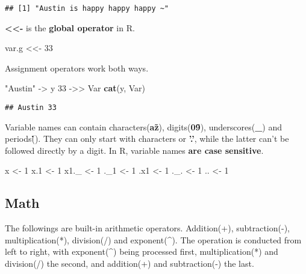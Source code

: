 \documentclass[
  12pt,
]{article}
\newenvironment{Shaded}{\begin{snugshade}}{\end{snugshade}}
\newcommand{\DecValTok}[1]{\textcolor[rgb]{0.00,0.00,0.81}{#1}}
\newcommand{\FloatTok}[1]{\textcolor[rgb]{0.00,0.00,0.81}{#1}}
\newcommand{\FunctionTok}[1]{\textcolor[rgb]{0.13,0.29,0.53}{\textbf{#1}}}
\newcommand{\NormalTok}[1]{#1}
\newcommand{\OtherTok}[1]{\textcolor[rgb]{0.56,0.35,0.01}{#1}}
\newcommand{\StringTok}[1]{\textcolor[rgb]{0.31,0.60,0.02}{#1}}
\begin{document}
\begin{verbatim}
## [1] "Austin is happy happy happy ~"
\end{verbatim}

\textbf{<<-} is the \textbf{global operator} in R.

\begin{Shaded}
\begin{Highlighting}[]
\NormalTok{var.g }\OtherTok{\textless{}\textless{}{-}} \DecValTok{33}
\end{Highlighting}
\end{Shaded}

Assignment operators work both ways.

\begin{Shaded}
\begin{Highlighting}[]
\StringTok{"Austin"} \OtherTok{{-}\textgreater{}}\NormalTok{ y}
\DecValTok{33} \OtherTok{{-}\textgreater{}\textgreater{}}\NormalTok{ Var}
\FunctionTok{cat}\NormalTok{(y, Var)}
\end{Highlighting}
\end{Shaded}

\begin{verbatim}
## Austin 33
\end{verbatim}

Variable names can contain characters(\textbf{a\~z}),
digits(\textbf{0\~9}), underscores(\textbf{\_}) and
periods(\textbf{\.}). They can only start with characters or
\textbf{'.'}, while the latter can't be followed directly by a digit. In
R, variable names \textbf{are case sensitive}.

\begin{Shaded}
\begin{Highlighting}[]
\NormalTok{x    }\OtherTok{\textless{}{-}} \DecValTok{1}
\NormalTok{x}\FloatTok{.1}  \OtherTok{\textless{}{-}} \DecValTok{1}
\NormalTok{x1.\_ }\OtherTok{\textless{}{-}} \DecValTok{1}
\NormalTok{.\_1  }\OtherTok{\textless{}{-}} \DecValTok{1}
\NormalTok{.x1  }\OtherTok{\textless{}{-}} \DecValTok{1}
\NormalTok{.\_.  }\OtherTok{\textless{}{-}} \DecValTok{1}
\NormalTok{..   }\OtherTok{\textless{}{-}} \DecValTok{1}
\end{Highlighting}
\end{Shaded}

\newpage
\subsection{Math}
\label{sec:BRS-math}

The followings are built-in arithmetic operators. \newline Addition(+),
subtraction(-), multiplication(*), division(/) and exponent(\^{}). The
operation is conducted from left to right, with exponent(\^{}) being
processed first, multiplication(*) and division(/) the second, and
addition(+) and subtraction(-) the last.
\end{document}
